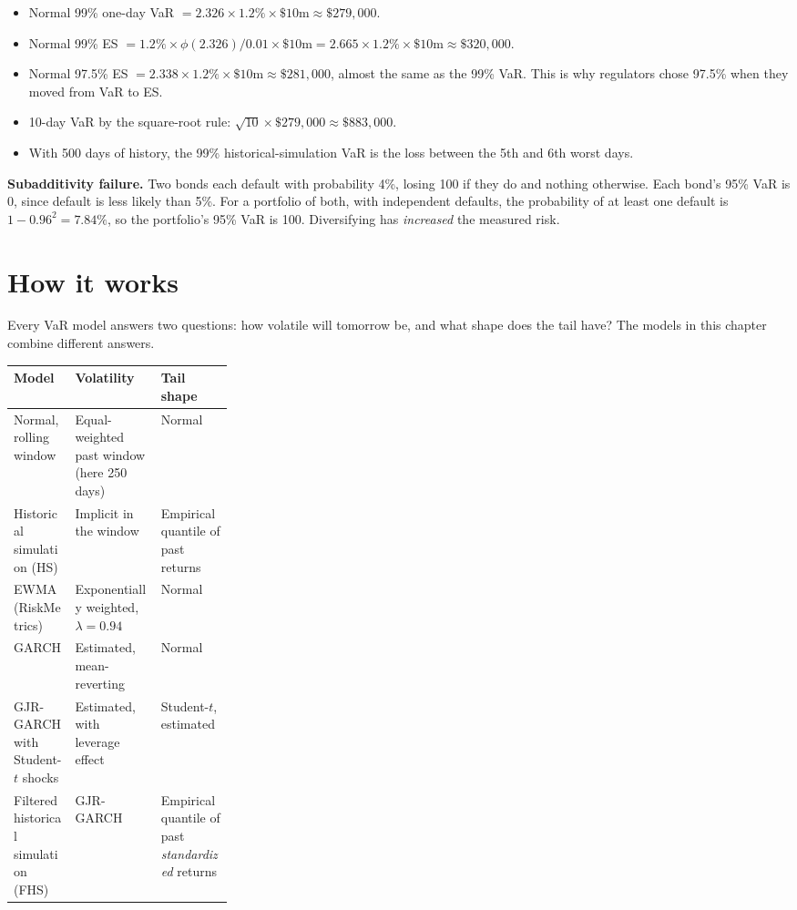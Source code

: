 \begin{itemize}
  \item Normal 99\% one-day VaR $= 2.326 \times 1.2\% \times \$10\text{m} \approx \$279{,}000$.
  \item Normal 99\% ES $= 1.2\% \times \phi(2.326)/0.01 \times \$10\text{m} = 2.665 \times 1.2\% \times \$10\text{m} \approx \$320{,}000$.
  \item Normal 97.5\% ES $= 2.338 \times 1.2\% \times \$10\text{m} \approx \$281{,}000$, almost the same as the 99\% VaR. This is why regulators chose 97.5\% when they moved from VaR to ES.
  \item 10-day VaR by the square-root rule: $\sqrt{10} \times \$279{,}000 \approx \$883{,}000$.
  \item With 500 days of history, the 99\% historical-simulation VaR is the loss between the 5th and 6th worst days.
\end{itemize}

\textbf{Subadditivity failure.} Two bonds each default with probability 4\%, losing 100 if they do and nothing otherwise. Each bond's 95\% VaR is 0, since default is less likely than 5\%. For a portfolio of both, with independent defaults, the probability of at least one default is $1 - 0.96^2 = 7.84\%$, so the portfolio's 95\% VaR is 100. Diversifying has \emph{increased} the measured risk.

\section{How it works}
\label{sec:15-how}

Every VaR model answers two questions: how volatile will tomorrow be, and what shape does the tail have? The models in this chapter combine different answers.

\begin{center}
\small
\begin{tabularx}{0.9\linewidth}{@{}>{\raggedright\arraybackslash}p{0.28\linewidth}>{\raggedright\arraybackslash}X>{\raggedright\arraybackslash}X@{}}
\toprule
Model & Volatility & Tail shape \\
\midrule
Normal, rolling window & Equal-weighted past window (here 250 days) & Normal \\
Historical simulation (HS) & Implicit in the window & Empirical quantile of past returns \\
EWMA (RiskMetrics) & Exponentially weighted, $\lambda = 0.94$ & Normal \\
GARCH & Estimated, mean-reverting & Normal \\
GJR-GARCH with Student-$t$ shocks & Estimated, with leverage effect & Student-$t$, estimated \\
Filtered historical simulation (FHS) & GJR-GARCH & Empirical quantile of past \emph{standardized} returns \\
\bottomrule
\end{tabularx}
\end{center}

